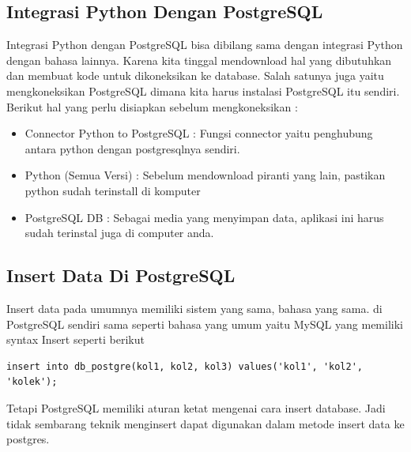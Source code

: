 \subsection{Integrasi Python Dengan PostgreSQL} 
Integrasi Python dengan PostgreSQL bisa dibilang sama dengan integrasi Python dengan bahasa lainnya.  Karena kita tinggal mendownload hal yang dibutuhkan dan membuat kode untuk dikoneksikan ke database. Salah satunya juga yaitu mengkoneksikan PostgreSQL dimana kita harus instalasi PostgreSQL itu sendiri. Berikut hal yang perlu disiapkan sebelum mengkoneksikan : 
\begin{itemize}
\item Connector Python to PostgreSQL : Fungsi connector yaitu penghubung antara python dengan postgresqlnya sendiri. 
\item Python (Semua Versi) : Sebelum mendownload piranti yang lain, pastikan python sudah terinstall di komputer
\item PostgreSQL DB : Sebagai media yang menyimpan data, aplikasi ini harus sudah terinstal juga di computer anda.
\end{itemize}

\subsection{Insert Data Di PostgreSQL}
Insert data pada umumnya memiliki sistem yang sama, bahasa yang sama. di PostgreSQL sendiri sama seperti bahasa yang umum yaitu MySQL yang memiliki syntax Insert seperti berikut
\begin{verbatim}
insert into db_postgre(kol1, kol2, kol3) values('kol1', 'kol2', 'kolek');
\end{verbatim}
Tetapi PostgreSQL memiliki aturan ketat mengenai cara insert database. Jadi tidak sembarang teknik menginsert dapat digunakan dalam metode insert data ke postgres.

